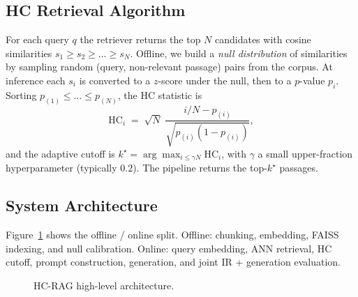 \documentclass[letterpaper]{article}
\begin{document}
\subsection{HC Retrieval Algorithm}
For each query $q$ the retriever returns the top $N$ candidates with
cosine similarities $s_1 \ge s_2 \ge \dots \ge s_N$. Offline, we build
a \emph{null distribution} of similarities by sampling random
(query, non-relevant passage) pairs from the corpus. At inference each
$s_i$ is converted to a $z$-score under the null, then to a $p$-value
$p_i$. Sorting $p_{(1)} \le \dots \le p_{(N)}$, the HC statistic is
\[
\mathrm{HC}_i \;=\; \sqrt{N}\;\frac{i/N - p_{(i)}}{\sqrt{p_{(i)}(1-p_{(i)})}},
\]
and the adaptive cutoff is
$k^\star = \arg\max_{i \le \gamma N} \mathrm{HC}_i$, with $\gamma$ a
small upper-fraction hyperparameter (typically $0.2$). The pipeline
returns the top-$k^\star$ passages.

\subsection{System Architecture}
Figure~\ref{fig:arch} shows the offline / online split. Offline:
chunking, embedding, FAISS indexing, and null calibration. Online:
query embedding, ANN retrieval, HC cutoff, prompt construction,
generation, and joint IR + generation evaluation.

\begin{figure}[t]
\centering
\caption{HC-RAG high-level architecture.}
\label{fig:arch}
\end{figure}
\end{document}
